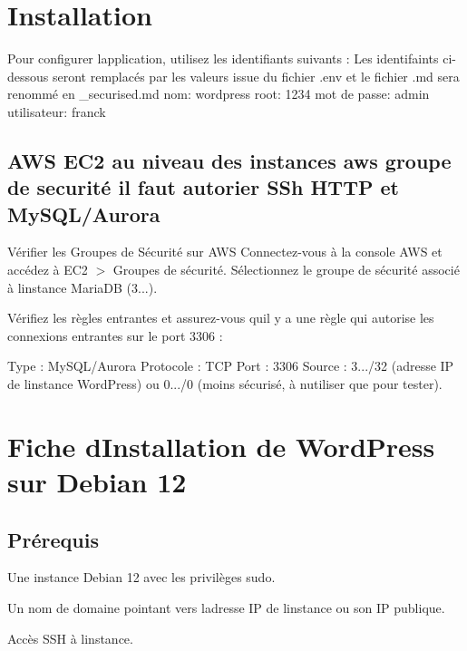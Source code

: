 \section*{Installation}

Pour configurer l\textquotesingle{}application, utilisez les identifiants suivants \+: Les identifaints ci-\/dessous seront remplacés par les valeurs issue du fichier .env et le fichier .md sera renommé en \+\_\+securised.\+md nom\+: wordpress root\+: 1234 mot de passe\+: admin utilisateur\+: franck

\subsection*{A\+WS E\+C2 au niveau des instances aws groupe de securité il faut autorier S\+Sh H\+T\+TP et My\+S\+Q\+L/\+Aurora}

Vérifier les Groupes de Sécurité sur A\+WS Connectez-\/vous à la console A\+WS et accédez à E\+C2 $>$ Groupes de sécurité. Sélectionnez le groupe de sécurité associé à l\textquotesingle{}instance Maria\+DB (3...).

Vérifiez les règles entrantes et assurez-\/vous qu\textquotesingle{}il y a une règle qui autorise les connexions entrantes sur le port 3306 \+:

Type \+: My\+S\+Q\+L/\+Aurora Protocole \+: T\+CP Port \+: 3306 Source \+: 3.../32 (adresse IP de l\textquotesingle{}instance Word\+Press) ou 0.../0 (moins sécurisé, à n\textquotesingle{}utiliser que pour tester).

\section*{Fiche d\textquotesingle{}Installation de Word\+Press sur Debian 12}

\subsection*{Prérequis}


\begin{DoxyItemize}
\item Une instance Debian 12 avec les privilèges {\ttfamily sudo}.
\item Un nom de domaine pointant vers l\textquotesingle{}adresse IP de l\textquotesingle{}instance ou son IP publique.
\item Accès S\+SH à l\textquotesingle{}instance.
\end{DoxyItemize}


